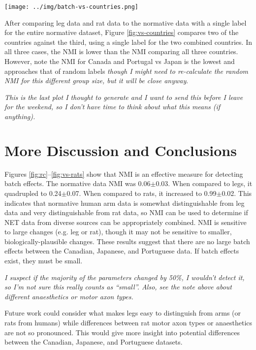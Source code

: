 \documentclass[12pt]{article}
\begin{document}
\pagebreak

\begin{figure*}
  \centering
       \texttt{[image: ../img/batch-vs-countries.png]}
         \caption{}
  \label{fig:vs-countries}
\end{figure*}

After comparing leg data and rat data to the normative data with a single label for the entire normative dataset, Figure \ref{fig:vs-countries} compares two of the countries against the third, using a single label for the two combined countries. In all three cases, the NMI is lower than the NMI comparing all three countries. However, note the NMI for Canada and Portugal vs Japan is the lowest and approaches that of random labels \emph{though I might need to re-calculate the random NMI for this different group size, but it will be close anyway}.

\emph{This is the last plot I thought to generate and I want to send this before I leave for the weekend, so I don't have time to think about what this means (if anything).}

\pagebreak

\section*{More Discussion and Conclusions}

Figures \ref{fig:rc}–\ref{fig:vs-rats} show that NMI is an effective measure for detecting batch effects. The normative data NMI was 0.06$\pm$0.03. When compared to legs, it quadrupled to 0.24$\pm$0.07. When compared to rats, it increased to 0.99$\pm$0.02. This indicates that normative human arm data is somewhat distinguishable from leg data and very distinguishable from rat data, so NMI can be used to determine if NET data from diverse sources can be appropriately combined. NMI is sensitive to large changes (e.g. leg or rat), though it may not be sensitive to smaller, biologically-plausible changes. These results suggest that there are no large batch effects between the Canadian, Japanese, and Portuguese data. If batch effects exist, they must be small.

\emph{I suspect if the majority of the parameters changed by 50\%, I wouldn't detect it, so I'm not sure this really counts as ``small''. Also, see the note above about different anaesthetics or motor axon types.}

Future work could consider what makes legs easy to distinguish from arms (or rats from humans) while differences between rat motor axon types or anaesthetics are not so pronounced. This would give more insight into potential differences between the Canadian, Japanese, and Portuguese datasets.
\end{document}
